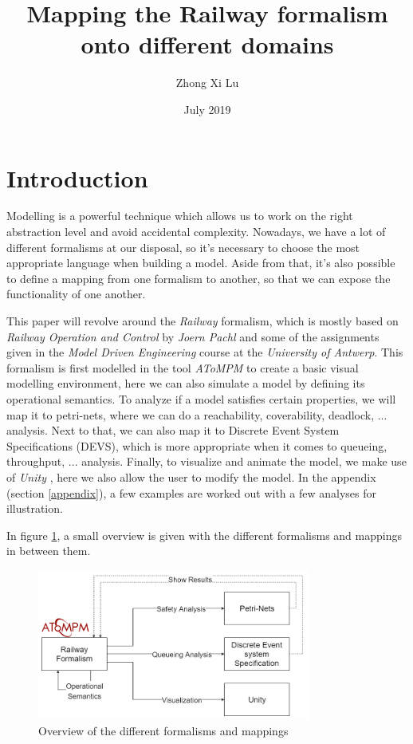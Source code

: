 \documentclass{article}
\title{Mapping the Railway formalism onto different domains}
\author{Zhong Xi Lu}
\affil{\small Department of Mathematics \\ and Computer Science \\ University of Antwerp, Belgium \\ \email{zhong-xi.lu@student.uantwerpen.be}}
\date{July 2019}
\begin{document}
\maketitle

\section{Introduction}

Modelling is a powerful technique which allows us to work on the right abstraction level and avoid accidental complexity. Nowadays, we have a lot of different formalisms at our disposal, so it's necessary to choose the most appropriate language when building a model. Aside from that, it's also possible to define a mapping from one formalism to another, so that we can expose the functionality of one another.

This paper will revolve around the \textit{Railway} formalism, which is mostly based on \textit{Railway Operation and Control} \cite{railway_book} by \textit{Joern Pachl} and some of the assignments \cite{assignments} given in the \textit{Model Driven Engineering} course at the \textit{University of Antwerp}. This formalism is first modelled in the tool \textit{AToMPM} \cite{atompm} to create a basic visual modelling environment, here we can also simulate a model by defining its operational semantics. To analyze if a model satisfies certain properties, we will map it to petri-nets, where we can do a reachability, coverability, deadlock, ... analysis. Next to that, we can also map it to Discrete Event System Specifications (DEVS), which is more appropriate when it comes to queueing, throughput, ... analysis. Finally, to visualize and animate the model, we make use of \textit{Unity} \cite{unity}, here we also allow the user to modify the model. In the appendix (section \ref{appendix}), a few examples are worked out with a few analyses for illustration.

In figure \ref{overview}, a small overview is given with the different formalisms and mappings in between them.

\begin{figure}[H]
    \centering
    \includegraphics[width=0.8\textwidth]{images/overview.png}
    \caption{Overview of the different formalisms and mappings}
    \label{overview}
\end{figure}
\end{document}
